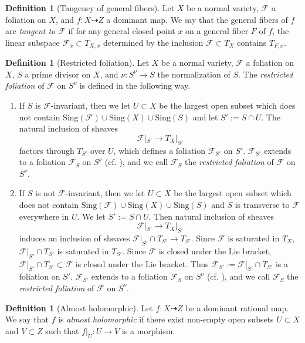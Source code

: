\documentclass[11pt]{amsart}
\numberwithin{equation}{section}
\newcommand{\Ff}{\mathcal{F}}
\newcommand{\Sing}{\mathrm{Sing}}
\theoremstyle{definition}
\newtheorem{defn}[thm]{Definition}
\theoremstyle{definition}
\theoremstyle{definition}
\begin{document}
\begin{defn}[Tangency of general fibers]
 Let $X$ be a normal variety, $\Ff$ a foliation on $X$, and $f: X\dashrightarrow Z$ a dominant map. We say that the general fibers of $f$ are \emph{tangent to $\Ff$} if for any general closed point $x$ on a general fiber $F$ of $f$, the linear subspace $\Ff_x\subset T_{X,x}$ determined by the inclusion $\Ff\subset T_X$ contains $T_{F,x}$.
\end{defn}


\begin{defn}[Restricted foliation]\label{defn: restricted foliation}
Let $X$ be a normal variety, $\Ff$ a foliation on $X$, $S$ a prime divisor on $X$, and $\nu: S^\nu\rightarrow S$ the normalization of $S$. The \emph{restricted foliation} of $\Ff$ on $S^\nu$ is defined in the following way. 
\begin{enumerate}
  \item If $S$ is $\Ff$-invariant, then we let $U\subset X$ be the largest open subset which does not contain $\Sing(\Ff)\cup\Sing(X)\cup\Sing(S)$ and let $S':=S\cap U$. The natural inclusion of sheaves
  $$\Ff|_{S'}\rightarrow T_X|_{S'}$$
  factors through $T_{S'}$ over $U$, which defines a foliation $\Ff_{S'}$ on $S'$. $\Ff_{S'}$ extends to a foliation $\Ff_S$ on $S^\nu$ (cf. \cite[Lemma 2.2]{CS23b}), and we call $\Ff_S$ the  \emph{restricted foliation} of $\Ff$ on $S^\nu$.
  \item If $S$ is not $\Ff$-invariant, then we let $U\subset X$ be the largest open subset which does not contain $\Sing(\Ff)\cup\Sing(X)\cup\Sing(S)$ and $S$ is transverse to $\Ff$ everywhere in $U$. We let $S':=S\cap U$. Then natural inclusion of sheaves $$\Ff|_{S'}\rightarrow T_X|_{S'}$$ induces an inclusion of sheaves $\Ff|_{S'}\cap T_{S'}\rightarrow T_{S'}$. Since $\Ff$ is saturated in $T_X$, $\Ff|_{S'}\cap T_{S'}$ is saturated in $T_{S'}$. Since $\Ff$ is closed under the Lie bracket, $\Ff|_{S'}\cap T_{S'}\subset\Ff$ is closed under the Lie bracket. Thus $\Ff_{S'}:=\Ff|_{S'}\cap T_{S'}$ is a foliation on $S'$. $\Ff_{S'}$ extends to a foliation $\Ff_S$ on $S^\nu$ (cf. \cite[Lemma 2.2]{CS23b}), and we call $\Ff_S$ the  \emph{restricted foliation} of $\Ff$ on $S^\nu$.
\end{enumerate}
\end{defn}

\begin{defn}[Almost holomorphic]
    Let $f: X\dashrightarrow Z$ be a dominant rational map. We say that $f$ is \emph{almost holomorphic} if there exist non-empty open subsets $U\subset X$ and $V\subset Z$ such that $f|_U: U\rightarrow V$ is a morphism. 
\end{defn}
\end{document}

